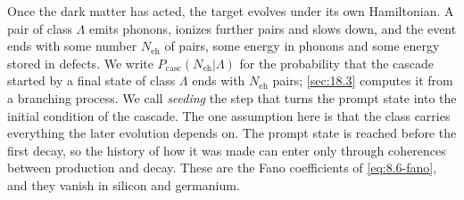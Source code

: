 Once the dark matter has acted, the target evolves under its own Hamiltonian. A pair of class $\Lambda$ emits phonons, ionizes further pairs and slows down, and the event ends with some number $N_{\mathrm{eh}}$ of pairs, some energy in phonons and some energy stored in defects. We write $P_{\mathrm{casc}}(N_{\mathrm{eh}}|\Lambda)$ for the probability that the cascade started by a final state of class $\Lambda$ ends with $N_{\mathrm{eh}}$ pairs; \cref{sec:18.3} computes it from a branching process. We call \emph{seeding} the step that turns the prompt state into the initial condition of the cascade. The one assumption here is that the class carries everything the later evolution depends on. The prompt state is reached before the first decay, so the history of how it was made can enter only through coherences between production and decay. These are the Fano coefficients of \cref{eq:8.6-fano}, and they vanish in silicon and germanium.

